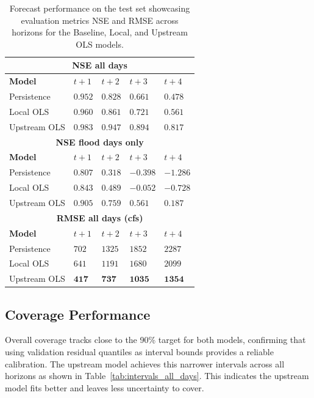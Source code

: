 \documentclass[10pt, twocolumn]{article}
\begin{document}
\begin{table}[h]
\centering
\caption{Forecast performance on the test set showcasing evaluation metrics NSE and RMSE across horizons for the Baseline, Local, and Upstream OLS models.}
\label{tab:nse}
\footnotesize
\begin{tabularx}{\columnwidth}{@{}lXXXX@{}}
\toprule
\multicolumn{5}{c}{\textbf{NSE all days}} \\
\midrule
\textbf{Model} & \textbf{$t{+}1$} & \textbf{$t{+}2$} & \textbf{$t{+}3$} & \textbf{$t{+}4$} \\
\midrule
Persistence  & $0.952$ & $0.828$ & $0.661$ & $0.478$ \\
Local OLS    & $0.960$ & $0.861$ & $0.721$ & $0.561$ \\
Upstream OLS & $\mathbf{0.983}$ & $\mathbf{0.947}$ & $\mathbf{0.894}$ & $\mathbf{0.817}$ \\
\midrule

\multicolumn{5}{c}{\textbf{NSE flood days only}} \\
\midrule
\textbf{Model} & \textbf{$t{+}1$} & \textbf{$t{+}2$} & \textbf{$t{+}3$} & \textbf{$t{+}4$} \\
\midrule
Persistence  & $0.807$ & $0.318$ & $-0.398$ & $-1.286$ \\
Local OLS    & $0.843$ & $0.489$ & $-0.052$ & $-0.728$ \\
Upstream OLS & $\mathbf{0.905}$ & $\mathbf{0.759}$ & $\mathbf{0.561}$ & $\mathbf{0.187}$ \\
\midrule

\multicolumn{5}{c}{\textbf{RMSE all days (cfs)}} \\
\midrule
\textbf{Model} & \textbf{$t{+}1$} & \textbf{$t{+}2$} & \textbf{$t{+}3$} & \textbf{$t{+}4$} \\
\midrule
Persistence  & $702$ & $1325$ & $1852$ & $2287$ \\
Local OLS    & $641$ & $1191$ & $1680$ & $2099$ \\
Upstream OLS & $\mathbf{417}$ & $\mathbf{737}$ & $\mathbf{1035}$ & $\mathbf{1354}$ \\
\bottomrule
\end{tabularx}
\end{table}


\subsection{Coverage Performance}

Overall coverage tracks close to the 90\% target for both models, confirming that using validation residual quantiles as interval bounds provides a reliable calibration. The upstream model achieves this narrower intervals across all horizons as shown in Table~\ref{tab:intervals_all_days}. This indicates the upstream model fits better and leaves less uncertainty to cover. 
\end{document}
